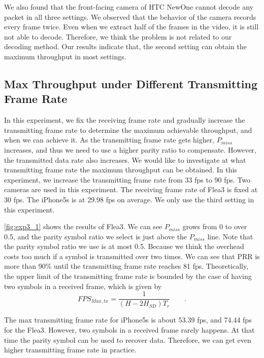 We also found that the front-facing camera of HTC NewOne cannot decode any packet in all three settings. We observed that the behavior of the camera records every frame twice. Even when we extract half of the frames in the video, it is still not able to decode.
Therefore, we think the problem is not related to our decoding method.
Our results indicate that, the second setting can obtain the maximum throughput in most settings.

\subsection{Max Throughput under Different Transmitting Frame Rate}
\label{sec:maxthroughput}
In this experiment, we fix the receiving frame rate and gradually increase the transmitting frame rate to determine the maximum achievable throughput, and when we can achieve it. As the transmitting frame rate gets higher, $P_{miss}$ increases, and thus we need to use a higher parity ratio to compensate. However, the transmitted data rate also increases. We would like to investigate at what transmitting frame rate the maximum throughput can be obtained.
In this experiment, we increase the transmitting frame rate from 33 fps to 90 fps. Two cameras are used in this experiment. The receiving frame rate of Flea3 is fixed at 30 fps. The iPhone5s is at 29.98 fps on average. We only use the third setting in this experiment.

\autoref{fig:exp3_1} shows the results of Flea3. We can see $P_{miss}$ grows from 0 to over 0.5, and the parity symbol ratio we select is just above the $P_{miss}$ line. Note that the parity symbol ratio we use is at most 0.5. Because we think the overhead costs too much if a symbol is transmitted over two times. We can see that PRR is more than 90\% until the transmitting frame rate reaches 81 fps. 
Theoretically, the upper limit of the transmitting frame rate is bounded by the case of having two symbols in a received frame, which is given by 
\begin{equation}
FPS_{Max,tx}= \frac{1}{(H - 2H_{SD}) T_r} \qquad \textrm{.}
\end{equation}

The max transmitting frame rate for iPhone5s is about 53.39 fps, and 74.44 fps for the Flea3. However, two symbols in a received frame rarely happens. At that time the parity symbol can be used to recover data. Therefore, we can get even higher transmitting frame rate in practice.

